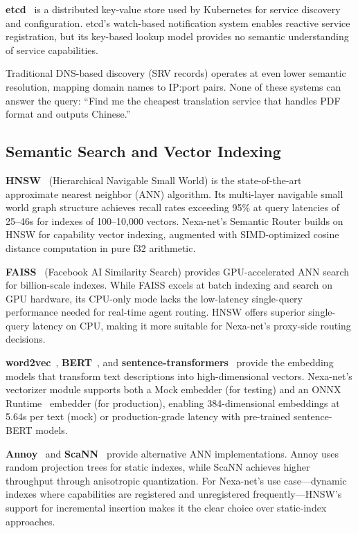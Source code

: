 \textbf{etcd}~\cite{etcd2016} is a distributed key-value store used by Kubernetes for service discovery and configuration. etcd's watch-based notification system enables reactive service registration, but its key-based lookup model provides no semantic understanding of service capabilities.

Traditional DNS-based discovery (SRV records) operates at even lower semantic resolution, mapping domain names to IP:port pairs. None of these systems can answer the query: ``Find me the cheapest translation service that handles PDF format and outputs Chinese.''

\subsection{Semantic Search and Vector Indexing}

\textbf{HNSW}~\cite{malkov2018hnsw} (Hierarchical Navigable Small World) is the state-of-the-art approximate nearest neighbor (ANN) algorithm. Its multi-layer navigable small world graph structure achieves recall rates exceeding 95\% at query latencies of 25--46\textmu s for indexes of 100--10,000 vectors. Nexa-net's Semantic Router builds on HNSW for capability vector indexing, augmented with SIMD-optimized cosine distance computation in pure f32 arithmetic.

\textbf{FAISS}~\cite{johnson2019faiss} (Facebook AI Similarity Search) provides GPU-accelerated ANN search for billion-scale indexes. While FAISS excels at batch indexing and search on GPU hardware, its CPU-only mode lacks the low-latency single-query performance needed for real-time agent routing. HNSW offers superior single-query latency on CPU, making it more suitable for Nexa-net's proxy-side routing decisions.

\textbf{word2vec}~\cite{mikolov2013word2vec}, \textbf{BERT}~\cite{devlin2019bert}, and \textbf{sentence-transformers}~\cite{reimers2019sentence} provide the embedding models that transform text descriptions into high-dimensional vectors. Nexa-net's vectorizer module supports both a Mock embedder (for testing) and an ONNX Runtime~\cite{onnxruntime2021} embedder (for production), enabling 384-dimensional embeddings at 5.64\textmu s per text (mock) or production-grade latency with pre-trained sentence-BERT models.

\textbf{Annoy}~\cite{spotify2019annoy} and \textbf{ScaNN}~\cite{google2020scann} provide alternative ANN implementations. Annoy uses random projection trees for static indexes, while ScaNN achieves higher throughput through anisotropic quantization. For Nexa-net's use case---dynamic indexes where capabilities are registered and unregistered frequently---HNSW's support for incremental insertion makes it the clear choice over static-index approaches.

